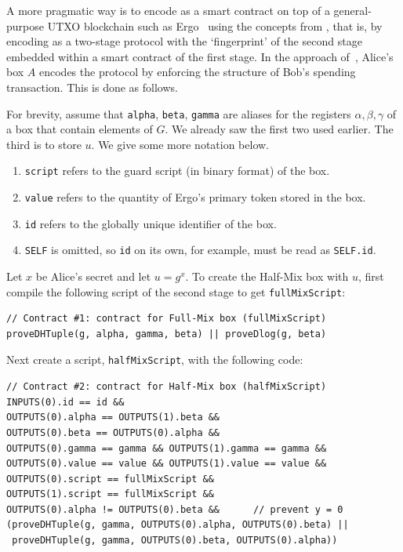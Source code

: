 \documentclass[runningheads]{llncs}
\begin{document}
A more pragmatic way is to encode \algname as a smart contract on top of a general-purpose UTXO blockchain such as Ergo~\cite{ergo} using the concepts from \cite{multistage}, that is, by encoding \algname as a two-stage protocol with the `fingerprint' of the second stage embedded within a smart contract of the first stage.
In the approach of~\cite{multistage}, Alice's box $A$ encodes the protocol by enforcing the structure of Bob's spending transaction. 
This is done as follows. 

For brevity, assume that \texttt{alpha}, \texttt{beta}, \texttt{gamma} are aliases for the registers $\alpha, \beta, \gamma$ of a box that contain elements of $G$. We already saw the first two used earlier. The third is to store $u$. We give some more notation below. 
\begin{enumerate}
    \item \texttt{script} refers to the guard script (in binary format) of the box.
    \item \texttt{value} refers to the quantity of Ergo's primary token stored in the box. 
    \item \texttt{id} refers to the globally unique identifier of the box. 
    \item \texttt{SELF} is omitted, so \texttt{id} on its own, for example, must be read as \texttt{SELF.id}. 
\end{enumerate}

Let $x$ be Alice's secret and let $u = g^x$. To create the Half-Mix box with $u$, first compile the following script of the second stage to get \texttt{fullMixScript}:
{\small
\begin{Verbatim}[frame=single]
// Contract #1: contract for Full-Mix box (fullMixScript)
proveDHTuple(g, alpha, gamma, beta) || proveDlog(g, beta)
\end{Verbatim}
}
Next create a script, \texttt{halfMixScript}, with the following code:
{\small
\begin{Verbatim}[frame=single]
// Contract #2: contract for Half-Mix box (halfMixScript)
INPUTS(0).id == id &&
OUTPUTS(0).alpha == OUTPUTS(1).beta && 
OUTPUTS(0).beta == OUTPUTS(0).alpha && 
OUTPUTS(0).gamma == gamma && OUTPUTS(1).gamma == gamma &&
OUTPUTS(0).value == value && OUTPUTS(1).value == value &&
OUTPUTS(0).script == fullMixScript &&  
OUTPUTS(1).script == fullMixScript &&
OUTPUTS(0).alpha != OUTPUTS(0).beta &&      // prevent y = 0
(proveDHTuple(g, gamma, OUTPUTS(0).alpha, OUTPUTS(0).beta) || 
 proveDHTuple(g, gamma, OUTPUTS(0).beta, OUTPUTS(0).alpha))
\end{Verbatim}
}
\end{document}
